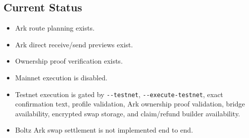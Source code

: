 \documentclass[
]{article}
\providecommand{\tightlist}{%
  \setlength{\itemsep}{0pt}\setlength{\parskip}{0pt}}
\begin{document}
\hypertarget{current-status}{%
\subsection{Current Status}\label{current-status}}

\begin{itemize}
\tightlist
\item
  Ark route planning exists.
\item
  Ark direct receive/send previews exist.
\item
  Ownership proof verification exists.
\item
  Mainnet execution is disabled.
\item
  Testnet execution is gated by \texttt{-\/-testnet},
  \texttt{-\/-execute-testnet}, exact confirmation text, profile
  validation, Ark ownership proof validation, bridge availability,
  encrypted swap storage, and claim/refund builder availability.
\item
  Boltz Ark swap settlement is not implemented end to end.
\end{itemize}
\end{document}
